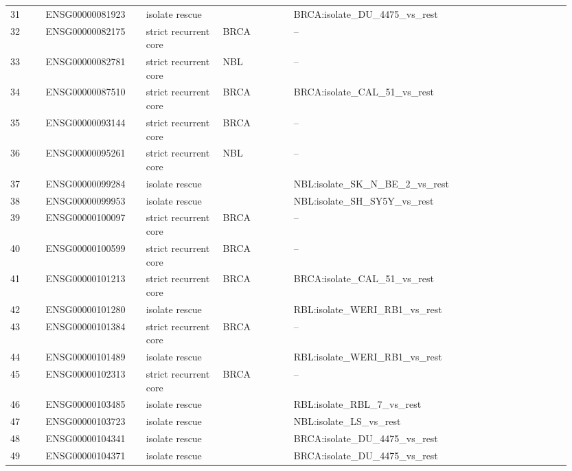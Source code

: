 \begin{landscape}
{\begin{longtable}{p{0.06\linewidth}p{0.17\linewidth}p{0.13\linewidth}p{0.12\linewidth}p{0.47\linewidth}}
31 & ENSG00000081923 & isolate rescue &  & BRCA:isolate\_\allowbreak{}DU\_\allowbreak{}4475\_\allowbreak{}vs\_\allowbreak{}rest \\
32 & ENSG00000082175 & strict recurrent core & BRCA & -- \\
33 & ENSG00000082781 & strict recurrent core & NBL & -- \\
34 & ENSG00000087510 & strict recurrent core & BRCA & BRCA:isolate\_\allowbreak{}CAL\_\allowbreak{}51\_\allowbreak{}vs\_\allowbreak{}rest \\
35 & ENSG00000093144 & strict recurrent core & BRCA & -- \\
36 & ENSG00000095261 & strict recurrent core & NBL & -- \\
37 & ENSG00000099284 & isolate rescue &  & NBL:isolate\_\allowbreak{}SK\_\allowbreak{}N\_\allowbreak{}BE\_\allowbreak{}2\_\allowbreak{}vs\_\allowbreak{}rest \\
38 & ENSG00000099953 & isolate rescue &  & NBL:isolate\_\allowbreak{}SH\_\allowbreak{}SY5Y\_\allowbreak{}vs\_\allowbreak{}rest \\
39 & ENSG00000100097 & strict recurrent core & BRCA & -- \\
40 & ENSG00000100599 & strict recurrent core & BRCA & -- \\
41 & ENSG00000101213 & strict recurrent core & BRCA & BRCA:isolate\_\allowbreak{}CAL\_\allowbreak{}51\_\allowbreak{}vs\_\allowbreak{}rest \\
42 & ENSG00000101280 & isolate rescue &  & RBL:isolate\_\allowbreak{}WERI\_\allowbreak{}RB1\_\allowbreak{}vs\_\allowbreak{}rest \\
43 & ENSG00000101384 & strict recurrent core & BRCA & -- \\
44 & ENSG00000101489 & isolate rescue &  & RBL:isolate\_\allowbreak{}WERI\_\allowbreak{}RB1\_\allowbreak{}vs\_\allowbreak{}rest \\
45 & ENSG00000102313 & strict recurrent core & BRCA & -- \\
46 & ENSG00000103485 & isolate rescue &  & RBL:isolate\_\allowbreak{}RBL\_\allowbreak{}7\_\allowbreak{}vs\_\allowbreak{}rest \\
47 & ENSG00000103723 & isolate rescue &  & NBL:isolate\_\allowbreak{}LS\_\allowbreak{}vs\_\allowbreak{}rest \\
48 & ENSG00000104341 & isolate rescue &  & BRCA:isolate\_\allowbreak{}DU\_\allowbreak{}4475\_\allowbreak{}vs\_\allowbreak{}rest \\
49 & ENSG00000104371 & isolate rescue &  & BRCA:isolate\_\allowbreak{}DU\_\allowbreak{}4475\_\allowbreak{}vs\_\allowbreak{}rest \\

\end{longtable}}
\end{landscape}
